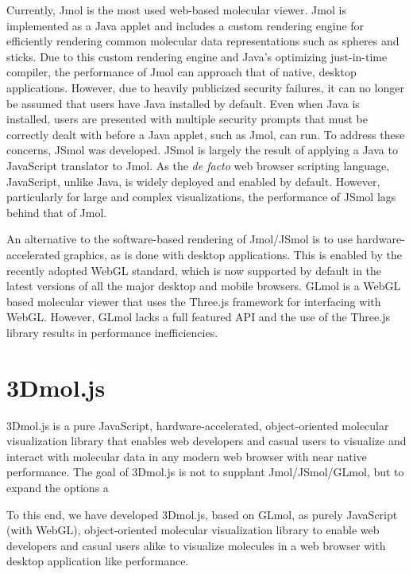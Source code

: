 \documentclass[]{bioinfo}
\begin{document}
Currently, Jmol\cite{jmol,hanson2010jmol} is the most used web-based molecular viewer. Jmol is implemented as a Java applet and includes a custom rendering engine for efficiently rendering common molecular data representations such as spheres and sticks.  Due to this custom rendering engine and Java's optimizing just-in-time compiler, the performance of Jmol can approach that of native, desktop applications.  However, due to heavily publicized security failures, it can no longer be assumed that users have Java installed by default\cite{doomedjava}.  Even when Java is installed, users are presented with multiple security prompts that must be correctly dealt with before a Java applet, such as Jmol, can run.
To address these concerns, JSmol\cite{hanson2013jsmol} was developed. JSmol is largely the result of applying a Java to JavaScript translator to Jmol. As the \textit{de facto} web browser scripting language, JavaScript, unlike Java, is widely deployed and enabled by default.  However, particularly for large and complex visualizations, the performance of JSmol lags behind that of Jmol.

An alternative to the software-based rendering of Jmol/JSmol is to use hardware-accelerated graphics, as is done with desktop applications.  This is enabled by the recently adopted WebGL\cite{webgl} standard, which is now supported by default in the latest versions of all the major desktop and mobile browsers. GLmol\cite{glmol} is a WebGL based molecular viewer that uses the Three.js\cite{threejs} framework for interfacing with WebGL.  However, GLmol lacks a full featured API and the use of the Three.js library results in performance inefficiencies.



\section{3Dmol.js}

3Dmol.js is a pure JavaScript, hardware-accelerated, object-oriented molecular visualization library that enables web developers and casual users to visualize and interact with molecular data in any modern web browser with near native performance.  The goal of 3Dmol.js is not to supplant Jmol/JSmol/GLmol, but to expand the options a

To this end, we have developed 3Dmol.js, based on GLmol, as purely JavaScript (with WebGL), object-oriented molecular visualization library to enable web developers and casual users alike to visualize molecules in a web browser with desktop application like performance.  
\end{document}
